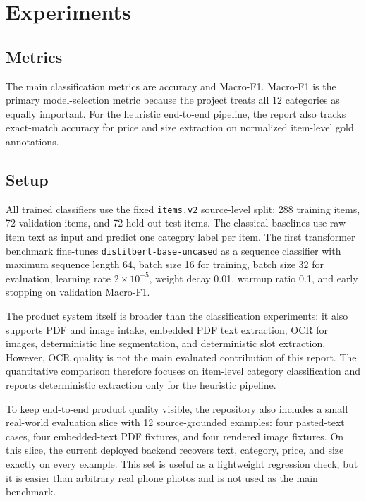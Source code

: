 \documentclass{article}
\begin{document}
\section{Experiments}

\subsection{Metrics}

The main classification metrics are accuracy and Macro-F1. Macro-F1 is the
primary model-selection metric because the project treats all 12 categories as
equally important. For the heuristic end-to-end pipeline, the report also
tracks exact-match accuracy for price and size extraction on normalized
item-level gold annotations.

\subsection{Setup}

All trained classifiers use the fixed \texttt{items.v2} source-level split:
288 training items, 72 validation items, and 72 held-out test items. The
classical baselines use raw item text as input and predict one category label
per item. The first transformer benchmark fine-tunes
\texttt{distilbert-base-uncased} as a sequence classifier with maximum
sequence length 64, batch size 16 for training, batch size 32 for evaluation,
learning rate $2 \times 10^{-5}$, weight decay 0.01, warmup ratio 0.1, and
early stopping on validation Macro-F1.

The product system itself is broader than the classification experiments: it
also supports PDF and image intake, embedded PDF text extraction, OCR for
images, deterministic line segmentation, and deterministic slot extraction.
However, OCR quality is not the main evaluated contribution of this report.
The quantitative comparison therefore focuses on item-level category
classification and reports deterministic extraction only for the heuristic
pipeline.

To keep end-to-end product quality visible, the repository also includes a
small real-world evaluation slice with 12 source-grounded examples: four
pasted-text cases, four embedded-text PDF fixtures, and four rendered image
fixtures. On this slice, the current deployed backend recovers text, category,
price, and size exactly on every example. This set is useful as a lightweight
regression check, but it is easier than arbitrary real phone photos and is not
used as the main benchmark.
\end{document}
